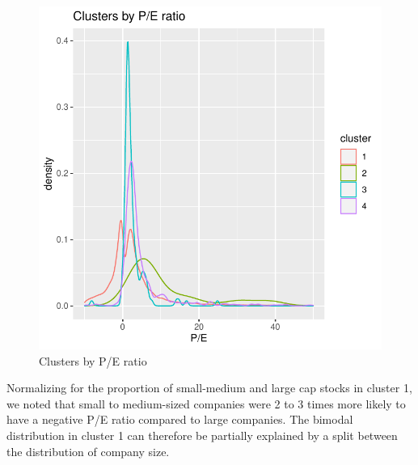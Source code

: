 \documentclass[11pt,]{article}
\begin{document}
\begin{figure}

{\centering \includegraphics{stock_analysis_files/figure-latex/pe ratio-1} 

}

\caption{Clusters by P/E ratio}\label{fig:pe ratio}
\end{figure}

Normalizing for the proportion of small-medium and large cap stocks in
cluster 1, we noted that small to medium-sized companies were 2 to 3
times more likely to have a negative P/E ratio compared to large
companies. The bimodal distribution in cluster 1 can therefore be
partially explained by a split between the distribution of company size.
\end{document}
